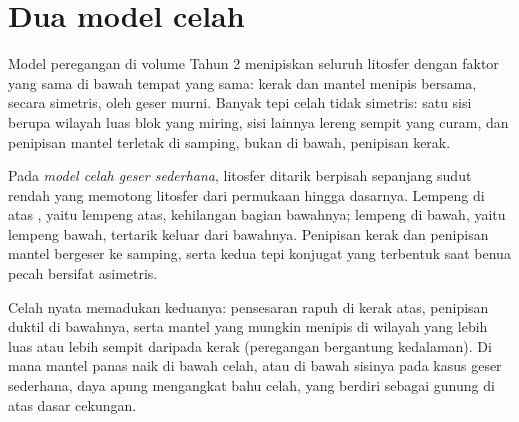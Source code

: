 \section{Dua model celah}\label{sec:b3:extension-strike-slip:models}

Model peregangan di volume Tahun 2 menipiskan seluruh litosfer dengan
faktor yang sama di bawah tempat yang sama: kerak dan mantel menipis bersama,
secara simetris, oleh geser murni. Banyak tepi celah tidak simetris: satu sisi
berupa wilayah luas blok yang miring, sisi lainnya lereng sempit yang curam, dan
penipisan mantel terletak di samping, bukan di bawah, penipisan kerak.

\begin{definition}\label{def:b3:extension-strike-slip:rift-models}
Pada \emph{model celah geser sederhana}, litosfer
ditarik berpisah sepanjang  sudut rendah yang memotong litosfer dari
permukaan hingga dasarnya. Lempeng di atas , yaitu lempeng atas,
kehilangan bagian bawahnya; lempeng di bawah, yaitu lempeng bawah, tertarik keluar
dari bawahnya. Penipisan kerak dan penipisan mantel
bergeser ke samping, serta kedua tepi konjugat yang terbentuk saat benua
pecah bersifat asimetris.
\end{definition}

Celah nyata memadukan keduanya: pensesaran rapuh di kerak atas, penipisan duktil
di bawahnya, serta mantel yang mungkin menipis di wilayah yang lebih luas atau lebih sempit daripada
kerak (peregangan bergantung kedalaman). Di mana mantel panas naik di bawah
celah, atau di bawah sisinya pada kasus geser sederhana, daya apung mengangkat
bahu celah, yang berdiri sebagai gunung di atas dasar cekungan.

